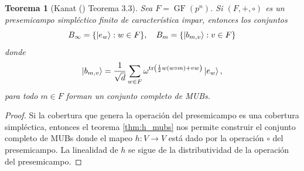 \documentclass[a4paper]{report}
\DeclareMathOperator{\tr}{tr}
\DeclareMathOperator{\GF}{GF}
\newtheorem{theorem}{Teorema}
\begin{document}
  \begin{theorem}[Kanat (\cite{abdukhalikov2015}) Teorema 3.3]
    \label{thm:kanat_presemi_mubs}
    Sea $F = \GF(p^{n})$. Si $(F, +, \circ)$ es un
    presemicampo simpléctico finito de característica impar,
    entonces los conjuntos
    \begin{equation}
      B_\infty = \{\ket{e_w} : w \in F\},
      \quad
      B_m = \{\ket{b_{m,v}} : v \in F\}
    \end{equation}
    donde 
    \begin{equation}
      \label{eqn:kanat_presemi_mubs}
      \ket{b_{m,v}}
      = \frac{1}{\sqrt{d}} \sum_{w \in F}^{}
      \omega^{\tr\left(
          \frac{1}{2} w (w \circ m) + v w
      \right) } \ket{e_w},
    \end{equation} 
    para todo $m \in F$ forman un conjunto completo de MUBs.
  \end{theorem}
  \begin{proof}
    Si la cobertura que genera la operación del presemicampo
    es una cobertura simpléctica, entonces el teorema
    \ref{thm:h_mubs} nos permite construir el conjunto
    completo de MUBs donde el mapeo $h : V \to V$ está dado
    por la operación $\circ$ del presemicampo. La linealidad
    de $h$ se sigue de la distributividad de la operación
    del presemicampo.
  \end{proof}
\end{document}

